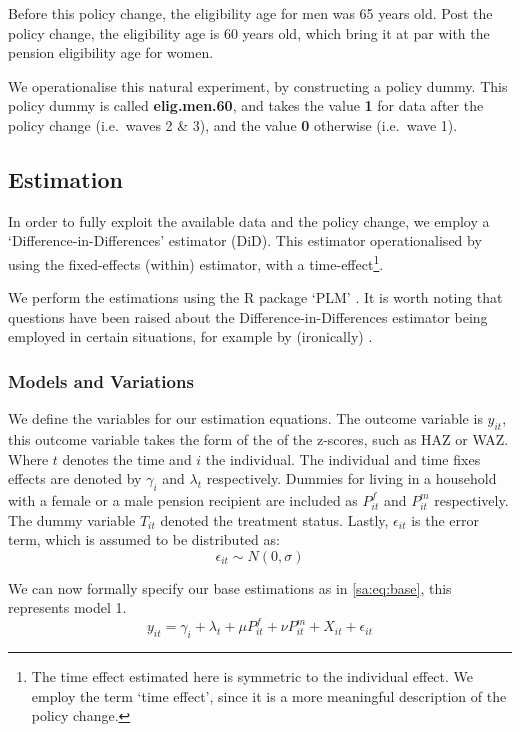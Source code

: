 \begin{refsection}
Before this policy change, the eligibility age for men was 65 years old.
Post the policy change, the eligibility age is 60 years old,
which bring it at par with the pension eligibility age for women.

We operationalise this natural experiment, by constructing a policy dummy.
This policy dummy is called \textbf{elig.men.60}, and takes the value \textbf{1}
for data after the policy change (i.e.~waves 2 \& 3), and the value \textbf{0} otherwise (i.e.~wave 1).

\subsection{Estimation}
In order to fully exploit the available data and the policy change,
we employ a `Difference-in-Differences' estimator (DiD).
This estimator operationalised by using the fixed-effects (within) estimator, with a time-effect\footnote{The time effect estimated here is symmetric to the individual effect.
We employ the term `time effect', since it is a more meaningful description of the policy change.}.

We perform the estimations using the R package `PLM' \parencite[see][]{croissant2008panel}.
It is worth noting  that questions have been raised about the Difference-in-Differences estimator being employed in certain situations,
for example by (ironically) \textcite{bertrand2004much}.

\subsubsection{Models and Variations}
We define the variables for our estimation equations.
The outcome variable is $y_{it}$, this outcome variable takes the form of the of the z-scores,
such as HAZ or WAZ.
Where $t$ denotes the time and $i$ the individual.
The individual and time fixes effects are denoted by $\gamma_i$ and $\lambda_t$ respectively.
Dummies for living in a household with a female or a male pension recipient are included as $P^f_{it}$ and $P^m_{it}$ respectively.
The dummy variable $T_{it}$ denoted the treatment status.
Lastly, $\epsilon_{it}$ is the error term, which is assumed to be distributed as:
\[
\epsilon_{it} \sim N(0,\sigma)
\]

We can now formally specify our base estimations as in \autoref{sa:eq:base}, this represents model 1.
\begin{equation}
\label{sa:eq:base}
y_{it} = \gamma_i + \lambda_t + \mu P^f_{it} + \nu P^m_{it} + X_{it} + \epsilon_{it}
\end{equation}


\end{refsection}
